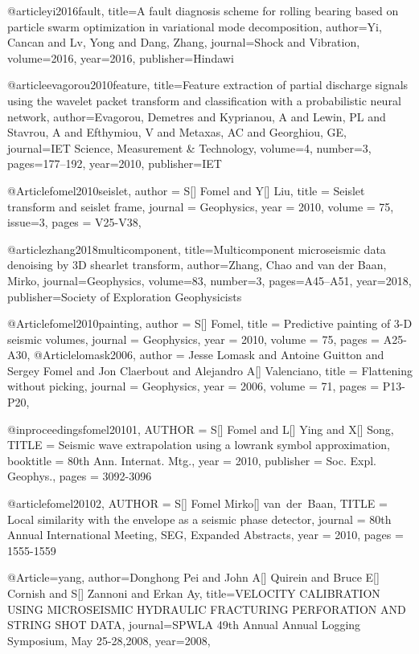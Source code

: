 @article{yi2016fault,
  title={A fault diagnosis scheme for rolling bearing based on particle swarm optimization in variational mode decomposition},
  author={Yi, Cancan and Lv, Yong and Dang, Zhang},
  journal={Shock and Vibration},
  volume={2016},
  year={2016},
  publisher={Hindawi}
}

@article{evagorou2010feature,
  title={Feature extraction of partial discharge signals using the wavelet packet transform and classification with a probabilistic neural network},
  author={Evagorou, Demetres and Kyprianou, A and Lewin, PL and Stavrou, A and Efthymiou, V and Metaxas, AC and Georghiou, GE},
  journal={IET Science, Measurement \& Technology},
  volume={4},
  number={3},
  pages={177--192},
  year={2010},
  publisher={IET}
}

@Article{fomel2010seislet,
  author = 	 {S[] Fomel and Y[] Liu},
  title = 	 {Seislet transform and seislet frame},
  journal = 	 {Geophysics},
  year = 	 2010,
  volume =	 75,
  issue=3,
  pages =	 {V25-V38},
}

@article{zhang2018multicomponent,
  title={Multicomponent microseismic data denoising by 3D shearlet transform},
  author={Zhang, Chao and van der Baan, Mirko},
  journal={Geophysics},
  volume={83},
  number={3},
  pages={A45--A51},
  year={2018},
  publisher={Society of Exploration Geophysicists}
}

@Article{fomel2010painting,
  author = 	 {S[] Fomel},
  title = 	 {Predictive painting of 3-{D} seismic volumes},
  journal = 	 {Geophysics},
  year = 	 2010,
  volume =	 75,
  pages =	 {A25-A30},
}
@Article{lomask2006,
  author = 	 {Jesse Lomask and Antoine Guitton and Sergey Fomel and Jon Claerbout and Alejandro A[] Valenciano},
  title = 	 {Flattening without picking},
  journal = 	 {Geophysics},
  year = 	 2006,
  volume =	 71,
  pages =	 {P13-P20},
}

@inproceedings{fomel20101,
  AUTHOR = {S[] Fomel and L[] Ying and X[] Song},
  TITLE = {Seismic wave extrapolation using a lowrank symbol approximation},
  booktitle =    {80th Ann. Internat. Mtg.},
  year = 	 {2010},
  publisher =    {Soc. Expl. Geophys.},
  pages = {3092-3096}
}

@article{fomel20102,
  AUTHOR = {S[] Fomel Mirko[] van~der~Baan},
  TITLE = {Local similarity with the envelope as a seismic phase detector},
  journal =    {80th Annual International Meeting, SEG, Expanded Abstracts},
  year = 	 {2010},
  pages = {1555-1559}
}

@Article={yang,
  author={Donghong Pei and John A[] Quirein and Bruce E[] Cornish and S[] Zannoni and Erkan Ay},
  title={VELOCITY CALIBRATION USING MICROSEISMIC HYDRAULIC FRACTURING PERFORATION AND STRING SHOT DATA},
  journal={SPWLA 49th Annual Annual Logging Symposium, May 25-28,2008},
  year=2008,
}


